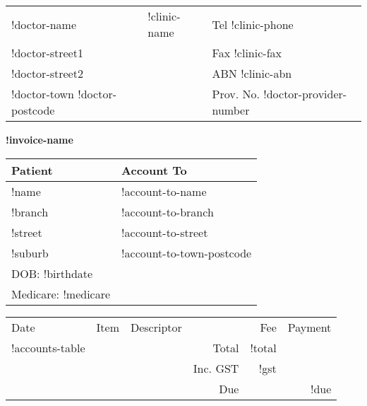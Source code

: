 \documentclass[12pt]{article}
\begin{document}
\begin{center}
\begin{tabular}{p{}>{\centering}p{}<{\centering}p{}<{\raggedleft}}
!doctor-name & {\Large !clinic-name } & Tel !clinic-phone \\
!doctor-street1 &  & Fax !clinic-fax \\
!doctor-street2 & & ABN !clinic-abn \\
!doctor-town !doctor-postcode & & Prov. No. !doctor-provider-number\\ 
\hline
\end{tabular}

\vspace{7mm}

{ \Large \textbf{!invoice-name} }

\end{center}

\vspace{7mm}

\begin{tabular}{ll} 
Patient & Account To \\ \midrule
!name & !account-to-name\\
!branch & !account-to-branch\\
!street & !account-to-street \\
!suburb & !account-to-town-postcode \\
DOB: !birthdate &  \\
Medicare:   !medicare & \\ 
\end{tabular}

\vspace{7mm}

\begin{tabularx}{\textwidth}{llXrrr}
Date & Item & Descriptor & & Fee & Payment \\ \cmidrule(l){1-6}
!accounts-table
\cmidrule(l){5-6}
& & & Total & !total  & \\
& & & Inc. GST & !gst & \\ \cmidrule(l){5-6}
& & & Due & & !due \\

\end{tabularx}
\end{document}
